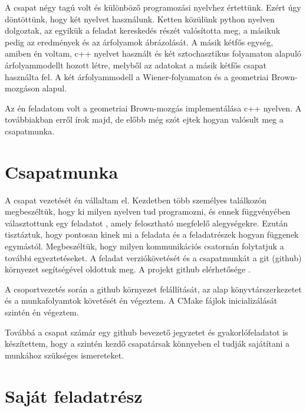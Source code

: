 \documentclass[a4paper, 12pt]{article}
\numberwithin{equation}{section}          %
\numberwithin{figure}{subsection}
\begin{document}
		A csapat négy tagú volt és különböző programozási nyelvhez értettünk.
		Ezért úgy döntöttünk, hogy két nyelvet használunk. Ketten közülünk python
		nyelven dolgoztak, az egyikük a feladat kereskedés részét valósította meg,
		a másikuk pedig az eredmények és az árfolyamok ábrázolását.
		A másik kétfős egység, amiben én voltam, c++ nyelvet használt és két
		sztochasztikus folyamaton alapuló árfolyammodellt hozott létre, melyből az adatokat
		a másik kétfős csapat használta fel. A két árfolyammodell a Wiener-folyamaton és a
		geometriai Brown-mozgáson alapul.
		
		Az én feladatom volt a geometriai Brown-mozgás implementálása c++ nyelven. A továbbiakban
		erről írok majd, de előbb még szót ejtek hogyan valósult meg a csapatmunka.
		
	
	\section{Csapatmunka}
	
		A csapat vezetését én vállaltam el. Kezdetben több személyes találkozón megbeszéltük,
		hogy ki milyen nyelven tud programozni, és ennek függvényében választottunk egy feladatot
		, amely felosztható megfelelő alegységekre. Ezután tisztáztuk, hogy pontosan kinek mi
		a feladata és a feladatrészek hogyan függenek egymástól.
		Megbeszéltük, hogy milyen kommunikációs csatornán folytatjuk a további egyeztetéseket.
		A feladat verziókövetését és a csapatmunkát a git (github) környezet segítségével oldottuk
		meg. A projekt github elérhetősége \cite{gitrepo}.
		
		A csoportvezetés során a github környezet felállítását, az alap könyvtárszerkezetet és
		a munkafolyamtok követését én végeztem. A CMake fájlok inicializálását szintén én végeztem.
		
		Továbbá a csapat számár egy github bevezető jegyzetet és gyakorlófeladatot is készítettem,
		hogy a szintén kezdő csapatársak könnyeben el tudják sajátítani a munkához szükséges
		ismereteket.
	
	
	\section{Saját feladatrész}
	
\end{document}
